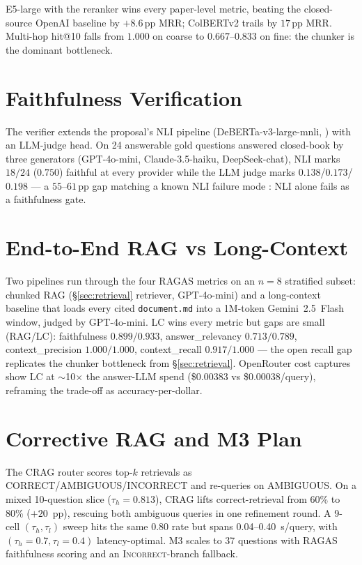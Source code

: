 \documentclass[11pt]{article}
\begin{document}
E5-large with the reranker wins every paper-level metric, beating the closed-source OpenAI baseline by $+8.6$\,pp MRR; ColBERTv2 trails by $17$\,pp MRR. Multi-hop hit@10 falls from $1.000$ on coarse to $0.667$--$0.833$ on fine: the chunker is the dominant bottleneck.

\section{Faithfulness Verification}
\label{sec:faith}

The verifier extends the proposal's NLI pipeline (DeBERTa-v3-large-mnli, \citealp{he2021debertav3}) with an LLM-judge head. On 24 answerable gold questions answered closed-book by three generators (GPT-4o-mini, Claude-3.5-haiku, DeepSeek-chat), NLI marks $18/24$ ($0.750$) faithful at every provider while the LLM judge marks $0.138$/$0.173$/$0.198$ --- a $55$--$61$\,pp gap matching a known NLI failure mode \citep{min-etal-2023-factscore,gao2023enabling}: NLI alone fails as a faithfulness gate.

\section{End-to-End RAG vs Long-Context}
\label{sec:ragas}

Two pipelines run through the four RAGAS metrics \citep{es2024ragas} on an $n{=}8$ stratified subset: chunked RAG (\S\ref{sec:retrieval} retriever, GPT-4o-mini) and a long-context baseline that loads every cited \texttt{document.md} into a 1M-token Gemini~2.5~Flash window, judged by GPT-4o-mini. LC wins every metric but gaps are small (RAG/LC): faithfulness $0.899/0.933$, answer\_relevancy $0.713/0.789$, context\_precision $1.000/1.000$, context\_recall $0.917/1.000$ --- the open recall gap replicates the chunker bottleneck from \S\ref{sec:retrieval}. OpenRouter cost captures show LC at $\sim$10$\times$ the answer-LLM spend (\$0.00383 vs \$0.00038/query), reframing the trade-off as accuracy-per-dollar.

\section{Corrective RAG and M3 Plan}
\label{sec:crag}

The CRAG router \citep{yan2024corrective} scores top-$k$ retrievals as CORRECT/AMBIGUOUS/INCORRECT and re-queries on AMBIGUOUS. On a mixed 10-question slice ($\tau_h{=}0.813$), CRAG lifts correct-retrieval from 60\% to 80\% (${+}20$~pp), rescuing both ambiguous queries in one refinement round. A 9-cell $(\tau_h, \tau_l)$ sweep hits the same 0.80 rate but spans
0.04--0.40~s/query, with $(\tau_h{=}0.7, \tau_l{=}0.4)$ latency-optimal. M3 scales to 37 questions with RAGAS faithfulness scoring and an \textsc{Incorrect}-branch fallback.

\newpage


\end{document}
